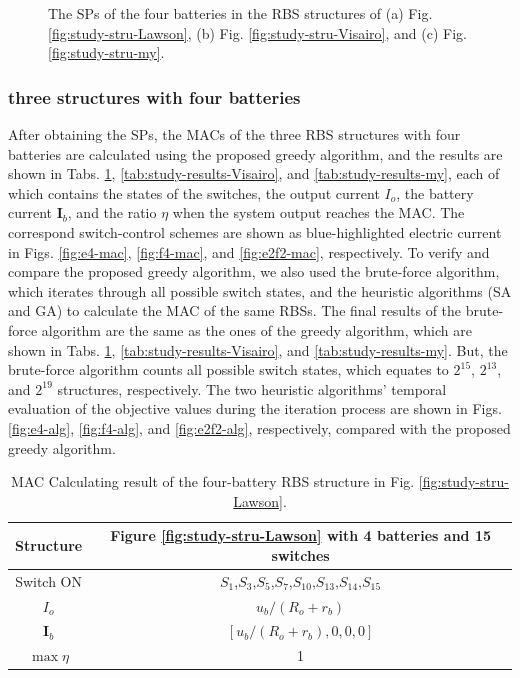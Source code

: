 \documentclass{article}
\begin{document}
\begin{figure}[htbp]
\begin{subfigure}[b]{0.31\textwidth}
        \caption{}
        \label{fig:e2f2-sp}
    \end{subfigure}
    \caption{The SPs of the four batteries in the RBS structures of (a) Fig. \ref{fig:study-stru-Lawson}, (b) Fig. \ref{fig:study-stru-Visairo}, and (c) Fig. \ref{fig:study-stru-my}.}
\end{figure}

\subsubsection{three structures with four batteries}

After obtaining the SPs, the MACs of the three RBS structures with four batteries are calculated using the proposed greedy algorithm, and the results are shown in Tabs. \ref{tab:study-results-Lawson}, \ref{tab:study-results-Visairo}, and \ref{tab:study-results-my}, each of which contains the states of the switches, the output current $I_o$, the battery current $\bm{I}_b$, and the ratio $\eta$ when the system output reaches the MAC.
The correspond switch-control schemes are shown as blue-highlighted electric current in Figs. \ref{fig:e4-mac}, \ref{fig:f4-mac}, and \ref{fig:e2f2-mac}, respectively.
To verify and compare the proposed greedy algorithm, we also used the brute-force algorithm, which iterates through all possible switch states, and the heuristic algorithms (SA and GA) to calculate the MAC of the same RBSs. 
The final results of the brute-force algorithm are the same as the ones of the greedy algorithm, which are shown in Tabs. \ref{tab:study-results-Lawson}, \ref{tab:study-results-Visairo}, and \ref{tab:study-results-my}.
But, the brute-force algorithm counts all possible switch states, which equates to $2^{15}$, $2^{13}$, and $2^{19}$ structures, respectively.
The two heuristic algorithms' temporal evaluation of the objective values during the iteration process are shown in Figs. \ref{fig:e4-alg}, \ref{fig:f4-alg}, and \ref{fig:e2f2-alg}, respectively, compared with the proposed greedy algorithm.

\begin{table}[htbp]
  \centering
    \caption{MAC Calculating result of the four-battery RBS structure in Fig. \ref{fig:study-stru-Lawson}.}
    \begin{tabular}{cc}
    \toprule
        Structure & Figure \ref{fig:study-stru-Lawson} with 4 batteries and 15 switches  \\
    \midrule
    Switch ON & $S_1$,$S_3$,$S_5$,$S_7$,$S_{10}$,$S_{13}$,$S_{14}$,$S_{15}$ \\
    $I_o$ & $u_b/(R_o+r_b)$ \\
    $\bm{I}_b$ & $[u_b/(R_o+r_b),0,0,0]$ \\
    $\max \eta$     & 1 \\
    \bottomrule
    \end{tabular}
  \label{tab:study-results-Lawson}
\end{table}
\end{document}
